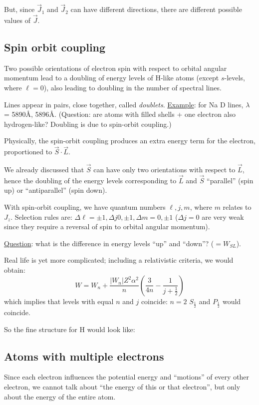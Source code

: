 \documentclass[11pt]{article}
\newcommand{\mar}[1]{\hspace{0pt}\marginpar{-\textcolor{black}{#1}-}}
\begin{document}
\mar{I 7}But, since $\vec{J}_{1}$ and $\vec{J}_{2}$ can have different directions,
there are different possible values of $\vec{J}$.

\subsection{Spin orbit coupling}
\mar{I 8}Two possible orientations of electron spin with respect to orbital
angular momentum lead to a doubling of energy levels of H-like atoms (except
$s$-levels, where $\ell=0$), also leading to doubling in the number of spectral
lines.

Lines appear in pairs, close together, called \textit{doublets}.
\underline{Example}: for Na D lines, $\lambda$ = 5890\AA{}, 5896\AA{}.
(Question: are atoms with filled shells + one electron also hydrogen-like?
Doubling is due to spin-orbit coupling.)

Physically, the spin-orbit coupling produces an extra energy term for the
electron, proportioned to $\vec{S}\cdot\vec{L}$.

We already discussed that $\vec{S}$ can have only two orientations with respect
to $\vec{L}$, hence the doubling of the energy levels corresponding to
$\vec{L}$ and $\vec{S}$ ``parallel'' (spin up) or ``antiparallel'' (spin down).

With spin-orbit coupling, we have quantum numbers $\ell, j, m$, where $m$
relates to $J_{z}$. Selection rules are:
$\Delta\ell = \pm 1, \Delta{j} 0, \pm 1, \Delta{m} = 0, \pm 1$
($\Delta{j} = 0$ are very weak since they require a reversal of spin to
orbital angular momentum).

\mar{I 9(a)}\underline{Question}: what is the difference in energy levels
``up'' and ``down''? ($=W_{SL}$).

Real life is yet more complicated; including a relativistic criteria, we
would obtain:
\[
    W = W_{n} + \frac{ |W_{n}| Z^{2} \alpha^{2}}{n}
    \left( \frac{3}{4n} - \frac{1}{j + \frac{1}{2}} \right)
    \]
\mar{I 9(b)}which implies that levels with equal $n$ and $j$ coincide:
$n=2$ $S_{\frac{1}{2}}$ and $P_{\frac{1}{2}}$ would coincide.

So the fine structure for H would look like:

\subsection{Atoms with multiple electrons}
\mar{I 10}Since each electron influences the potential energy and ``motions''
of every other electron, we cannot talk about ``the energy of this or that
electron'', but only about the energy of the entire atom.
\end{document}
